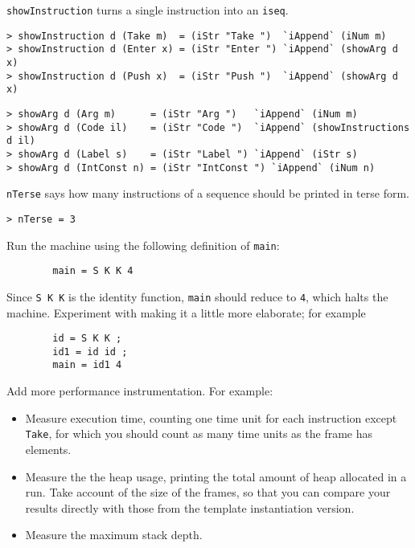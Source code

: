 %
\mbox{\tt showInstruction} turns a single instruction into an \mbox{\tt iseq}.
\begin{verbatim}
> showInstruction d (Take m)  = (iStr "Take ")  `iAppend` (iNum m)
> showInstruction d (Enter x) = (iStr "Enter ") `iAppend` (showArg d x)
> showInstruction d (Push x)  = (iStr "Push ")  `iAppend` (showArg d x)
\end{verbatim}
%
%
%
\begin{verbatim}
> showArg d (Arg m)      = (iStr "Arg ")   `iAppend` (iNum m)
> showArg d (Code il)    = (iStr "Code ")  `iAppend` (showInstructions d il)
> showArg d (Label s)    = (iStr "Label ") `iAppend` (iStr s)
> showArg d (IntConst n) = (iStr "IntConst ") `iAppend` (iNum n)
\end{verbatim}
%
%
%
%
\mbox{\tt nTerse} says how many instructions of a sequence should be
printed in terse form.
\begin{verbatim}
> nTerse = 3
\end{verbatim}
%

\begin{exercise}
Run the machine using the following definition of \mbox{\tt main}:
\begin{verbatim}
        main = S K K 4
\end{verbatim}
Since \mbox{\tt S\ K\ K} is the identity function, \mbox{\tt main} should reduce to \mbox{\tt 4},
which halts the machine.  Experiment with making it a little more elaborate;
for example
\begin{verbatim}
        id = S K K ;
        id1 = id id ;
        main = id1 4
\end{verbatim}
\end{exercise}

\begin{exercise}
Add more performance instrumentation.
For example:
\begin{itemize}
\item
Measure execution time, counting one time unit for each instruction
except \mbox{\tt Take}, for which you should count as many time units as the frame
has elements.
\item
Measure the
the heap usage, printing the total amount of heap allocated in a run.
Take account of the size of the frames,
so that you can compare your results directly with those from the
template instantiation version.
\item
Measure the maximum stack depth.
\end{itemize}
\end{exercise}

